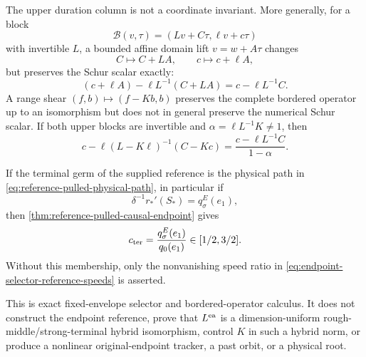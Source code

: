 \begin{lemma}
The upper duration column is not a coordinate invariant.  More generally,
for a block
\begin{equation*}
 \mathscr B(v,\tau)=(Lv+C\tau,\ell v+c\tau)
\end{equation*}
with invertible \(L\), a bounded affine domain lift
\(v=w+A\tau\) changes
\begin{equation}
 C\longmapsto C+LA,\qquad c\longmapsto c+\ell A,              \label{eq:endpoint-selector-domain-shear}
\end{equation}
but preserves the Schur scalar exactly:
\begin{equation}
 (c+\ell A)-\ell L^{-1}(C+LA)
 =c-\ell L^{-1}C.                               \label{eq:endpoint-selector-domain-schur-invariance}
\end{equation}
A range shear \((f,b)\mapsto(f-Kb,b)\) preserves the complete bordered
operator up to an isomorphism but does not in general preserve the
numerical Schur scalar.  If both upper blocks are invertible and
\(\alpha=\ell L^{-1}K\ne1\), then
\begin{equation}
 c-\ell(L-K\ell)^{-1}(C-Kc)
 =\frac{c-\ell L^{-1}C}{1-\alpha}.              \label{eq:endpoint-selector-range-schur-law}
\end{equation}

If the terminal germ of the supplied reference is the physical path in
\cref{eq:reference-pulled-physical-path}, in particular if
\begin{equation}
 \delta^{-1}r_*'(S_*)=q_\sigma^E(e_1),           \label{eq:endpoint-selector-structured-germ}
\end{equation}
then \cref{thm:reference-pulled-causal-endpoint} gives
\begin{equation}
 c_{\rm ter}
 =\frac{q_\sigma^E(e_1)}{q_0(e_1)}\in[1/2,3/2].             \label{eq:endpoint-selector-scalar-margin}
\end{equation}
Without this membership, only the nonvanishing speed ratio in
\cref{eq:endpoint-selector-reference-speeds} is asserted.

This is exact fixed-envelope selector and bordered-operator calculus.  It
does not construct the endpoint reference, prove that \(L^{\rm ea}\) is a
dimension-uniform rough-middle/strong-terminal hybrid isomorphism, control
\(K\) in such a hybrid norm, or produce a nonlinear original-endpoint
tracker, a past orbit, or a physical root.
\end{lemma}

